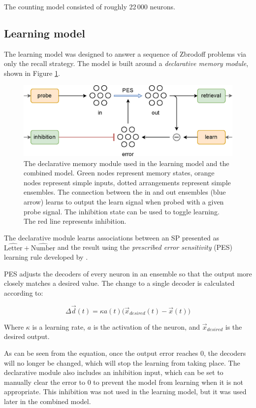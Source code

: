 \documentclass[10pt, a4paper, twocolumn]{article}
\begin{document}
The counting model consisted of roughly 22\,000 neurons.

\subsection{Learning model}

The learning model was designed to answer a sequence of Zbrodoff problems via only the recall strategy. The model is built around a \emph{declarative memory module}, shown in Figure \ref{fig:declarative-module}.

\begin{figure}[h]
	\centering
	\includegraphics[width=0.9\linewidth]{figures/declarative-module.eps}
	\caption{The declarative memory module used in the learning model and the combined model. Green nodes represent memory states, orange nodes represent simple inputs, dotted arrangements represent simple ensembles. The connection between the in and out ensembles (blue arrow) learns to output the learn signal when probed with a given probe signal. The inhibition state can be used to toggle learning. The red line represents inhibition.}
	\label{fig:declarative-module}
\end{figure}

The declarative module learns associations between an SP presented as $\hat{\text{Letter}} + \hat{\text{Number}}$ and the result using the \emph{prescribed error sensitivity} (PES) learning rule developed by \cite{Arsalidou2011}.

PES adjusts the decoders of every neuron in an ensemble so that the output more closely matches a desired value. The change to a single decoder is calculated according to:

$$\Delta \vec{d}(t) = \kappa a(t) \big(\vec{x}_{desired}(t) - \vec{x}(t)\big)$$

Where $\kappa$ is a learning rate, $a$ is the activation of the neuron, and $\vec{x}_{desired}$ is the desired output.

As can be seen from the equation, once the output error reaches 0, the decoders will no longer be changed, which will stop the learning from taking place. The declarative module also includes an inhibition input, which can be set to manually clear the error to 0 to prevent the model from learning when it is not appropriate. This inhibition was not used in the learning model, but it was used later in the combined model.
\end{document}
